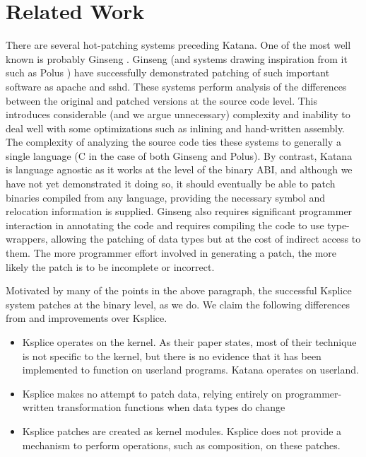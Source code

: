 \section{Related Work}
\label{sec:related}

There are several hot-patching systems preceding Katana. One of the
most well known is probably Ginseng \cite{ginseng}. Ginseng (and
systems drawing inspiration from it such as Polus \cite{polus}) have
successfully demonstrated patching of such important software as
apache and sshd. These systems perform analysis of the differences
between the original and patched versions at the source code
level. This introduces considerable (and we argue unnecessary)
complexity and inability to deal well with some optimizations such as
inlining and hand-written assembly. The complexity of analyzing the
source code ties these systems to generally a single language (C in
the case of both Ginseng and Polus). By contrast, Katana is language
agnostic as it works at the level of the binary ABI, and although we
have not yet demonstrated it doing so, it should eventually be able to
patch binaries compiled from any language, providing the necessary
symbol and relocation information is supplied. Ginseng also requires
significant programmer interaction in annotating the code
\cite{ginseng-manual} and requires compiling the code to use
type-wrappers, allowing the patching of data types but at the cost of
indirect access to them. The more programmer effort involved in
generating a patch, the more likely the patch is to be incomplete or
incorrect.

Motivated by many of the points in the above paragraph, the
successful Ksplice system \cite{ksplice} patches at the binary level, as we do. We
claim the following differences from and improvements over Ksplice.
\begin{itemize}
\item Ksplice operates on the kernel. As their paper states, most of their
  technique is not specific to the kernel, but there is no evidence
  that it has been implemented to function on userland programs.
  Katana operates on userland.
\item Ksplice makes no attempt to patch data, relying entirely on
  programmer-written transformation functions when data types do
  change
\item Ksplice patches are created as kernel modules. Ksplice does not
  provide a mechanism to perform operations, such as composition,
  on these patches.
\end{itemize}


